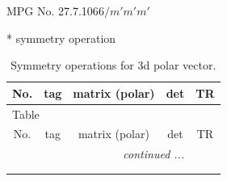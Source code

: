 \documentclass[fleqn,8pt]{jsarticle}
\begin{document}
\setcounter{MaxMatrixCols}{32}

\renewcommand{\tablename}{Table~}
\renewcommand{\figurename}{Figure~}
\begin{center}
\LARGE
MPG No. 27.7.106\quad$6/m'm'm'$
\end{center}
* symmetry operation
\renewcommand{\arraystretch}{1.3}
\begin{longtable}{ccccc}
\caption{Symmetry operations for 3d polar vector.}
 \\
 \hline \hline
No. & tag & matrix (polar) & det & TR \\ \hline \endfirsthead

\multicolumn{4}{l}{\tablename\ \thetable{}} \\
 \hline \hline
No. & tag & matrix (polar) & det & TR \\ \hline \endhead

 \hline \hline
\multicolumn{4}{r}{\footnotesize\it continued ...} \\ \endfoot

 \hline \hline
\multicolumn{4}{r}{} \\ \endlastfoot


\end{longtable}
\end{document}
